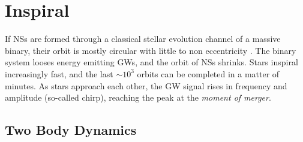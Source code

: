







\section{Inspiral}

If \acp{NS} are formed through a classical stellar evolution channel of a massive binary, 
their orbit is mostly circular with little to non eccentricity \citep{Aasi:2013wya}. 
%
The binary system looses energy emitting \acp{GW}, and the orbit of \acp{NS} 
shrinks. Stars inspiral increasingly fast, and the last ${\sim}10^3$ orbits can be completed in 
a matter of minutes. As stars approach each other, the \ac{GW} signal rises in 
frequency and amplitude (so-called chirp), reaching the peak at the \textit{moment of merger}.

\subsection{Two Body Dynamics}

